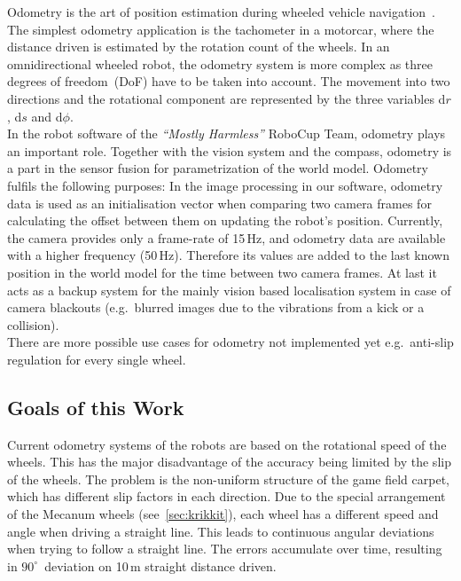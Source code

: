 \documentclass[12pt,a4paper]{article}
\newcommand{\MH}{\emph{``Mostly Harmless''} RoboCup Team\xspace}
\begin{document}
Odometry is the art of position estimation during wheeled vehicle navigation~\cite{webster}.
The simplest odometry application is the tachometer in a motorcar, where the distance driven is estimated by the rotation count of the wheels.
In an omnidirectional wheeled robot, the odometry system is more complex as three degrees of freedom~(DoF) have to be taken into account.
The movement into two directions and the rotational component are represented by the three variables d$r$, d$s$ and d$\phi$.\\
In the robot software of the \MH, odometry plays an important role.
Together with the vision system and the compass, odometry is a part in the sensor fusion for parametrization of the world model.
Odometry fulfils the following purposes:
In the image processing in our software, odometry data is used as an initialisation vector when comparing two camera frames for calculating the offset between them on updating the robot's position.
Currently, the camera provides only a frame-rate of 15\,Hz, and odometry data are available with a higher frequency (50\,Hz).
Therefore its values are added to the last known position in the world model for the time between two camera frames.
At last it acts as a backup system for the mainly vision based localisation system in case of camera blackouts (e.g.\ blurred images due to the vibrations from a kick or a collision).\\
There are more possible use cases for odometry not implemented yet e.g.\ anti-slip regulation for every single wheel.

\subsection{Goals of this Work}
\label{motivation}
  
Current odometry systems of the robots are based on the rotational speed of the wheels.
This has the major disadvantage of the accuracy being limited by the slip of the wheels. 
The problem is the non-uniform structure of the game field carpet, which has different slip factors in each direction.
Due to the special arrangement of the Mecanum wheels (see~\autoref{sec:krikkit}), each wheel has a different speed and angle when driving a straight line.
This leads to continuous angular deviations when trying to follow a straight line.
The errors accumulate over time, resulting in $90^\circ$~deviation on 10\,m straight distance driven.
\end{document}
